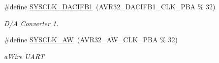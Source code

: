 \begin{DoxyCompactItemize}
\#define \hyperlink{group__sysclk__group_gabafc3d95b374fd0543a080132c6a123f}{\-S\-Y\-S\-C\-L\-K\-\_\-\-D\-A\-C\-I\-F\-B1}~(\-A\-V\-R32\-\_\-\-D\-A\-C\-I\-F\-B1\-\_\-\-C\-L\-K\-\_\-\-P\-B\-A \% 32)
\begin{DoxyCompactList}\small\item\em \-D/\-A \-Converter 1. \end{DoxyCompactList}\item 
\#define \hyperlink{group__sysclk__group_ga70d3d2ecde2ee79e6cdf0ddf62c5ce14}{\-S\-Y\-S\-C\-L\-K\-\_\-\-A\-W}~(\-A\-V\-R32\-\_\-\-A\-W\-\_\-\-C\-L\-K\-\_\-\-P\-B\-A \% 32)
\begin{DoxyCompactList}\small\item\em a\-Wire \-U\-A\-R\-T \end{DoxyCompactList}\end{DoxyCompactItemize}
